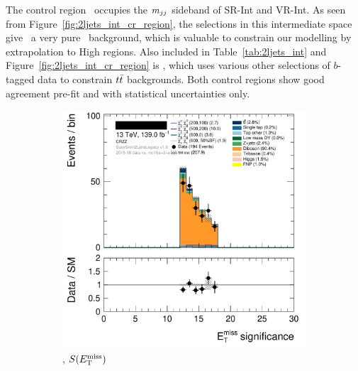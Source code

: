 The control region \crvz\ occupies the $m_{jj}$ sideband of SR-Int and VR-Int.
As seen from Figure~\ref{fig:2ljets_int_cr_region}, the selections in this
intermediate space give \crvz\ a very pure \diboson\ background, which is
valuable to constrain our modelling by extrapolation to High regions.
Also included in Table~\ref{tab:2ljets_int} and
Figure~\ref{fig:2ljets_int_cr_region} is \crtt, which uses various other
selections of $b$-tagged data to constrain $t\bar t$ backgrounds.
Both control regions show good agreement pre-fit and with statistical uncertainties
only.
\begin{figure}[tp]
\centering
\begin{subfigure}{0.48\textwidth}
\centering
\includegraphics[width=\textwidth]{figures/2ljets_def_met_Sign_CRZZ.png}
\caption{\crvz, $S(E_\mathrm{T}^\mathrm{miss})$}
\end{subfigure}
\hfill
\begin{subfigure}{0.48\textwidth}
\centering

\end{subfigure}
\end{figure}
